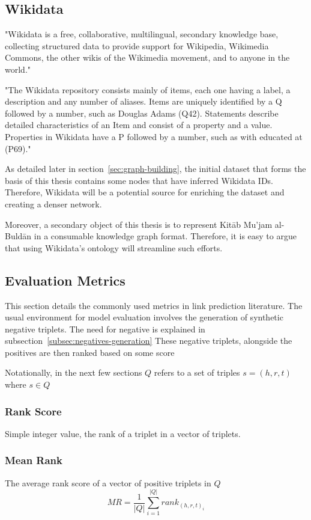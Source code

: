 \subsection{Wikidata}\label{subsec:introduction-wikidata}
"Wikidata is a free, collaborative, multilingual, secondary knowledge base, collecting structured data to provide support for Wikipedia, Wikimedia Commons, the other wikis of the Wikimedia movement,
and to anyone in the world."

"The Wikidata repository consists mainly of items, each one having a label, a description and any number of aliases.
Items are uniquely identified by a Q followed by a number, such as Douglas Adams (Q42).
Statements describe detailed characteristics of an Item and consist of a property and a value.
Properties in Wikidata have a P followed by a number, such as with educated at (P69)."~\cite{Wikidata}

As detailed later in section~\ref{sec:graph-building}, the initial dataset that forms the basis of this thesis contains some nodes that have inferred Wikidata IDs.
Therefore, Wikidata will be a potential source for enriching the dataset and creating a denser network.

Moreover, a secondary object of this thesis is to represent Kitāb Mu'jam al-Buldān in a consumable knowledge graph format.
Therefore, it is easy to argue that using Wikidata's ontology will streamline such efforts.


\subsection{Evaluation Metrics}
This section details the commonly used metrics in link prediction literature.
The usual environment for model evaluation involves the generation of synthetic negative triplets.
The need for negative is explained in subsection~\ref{subsec:negatives-generation}
These negative triplets, alongside the positives are then ranked based on some score

Notationally, in the next few sections $Q$ refers to a set of triples $s = (h,r,t)$ where $s \in Q$~\cite{ampligraph}
\subsubsection{Rank Score}
Simple integer value, the rank of a triplet in a vector of triplets.

\subsubsection{Mean Rank}
The average rank score of a vector of positive triplets in $Q$
\[
MR = \frac{1}{|Q|}\sum_{i = 1}^{|Q|}rank_{(h, r, t)_i}
\]

